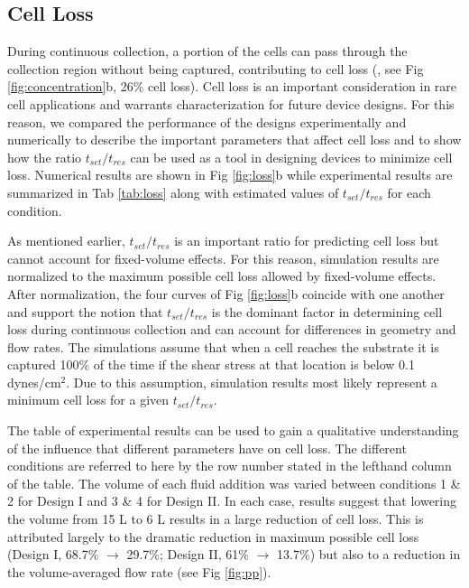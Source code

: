 \subsection{Cell Loss}

During continuous collection, a portion of the cells can pass through the collection region without being captured, contributing to cell loss (\eg , see Fig \ref{fig:concentration}b, 26\% cell loss). Cell loss is an important consideration in rare cell applications and warrants characterization for future device designs. For this reason, we compared the performance of the designs experimentally and numerically to describe the important parameters that affect cell loss and to show how the ratio $t_{set}/t_{res}$ can be used as a tool in designing devices to minimize cell loss. Numerical results are shown in Fig \ref{fig:loss}b while experimental results are summarized in Tab \ref{tab:loss} along with estimated values of $t_{set}/t_{res}$ for each condition.

As mentioned earlier, $t_{set}/t_{res}$ is an important ratio for predicting cell loss but cannot account for fixed-volume effects. For this reason, simulation results are normalized to the maximum possible cell loss allowed by fixed-volume effects. After normalization, the four curves of Fig \ref{fig:loss}b coincide with one another and support the notion that $t_{set}/t_{res}$ is the dominant factor in determining cell loss during continuous collection and can account for differences in geometry and flow rates. The simulations assume that when a cell reaches the substrate it is captured 100\% of the time if the shear stress at that location is below 0.1 dynes/cm$^{2}$. Due to this assumption, simulation results most likely represent a minimum cell loss for a given $t_{set}/t_{res}$.

The table of experimental results can be used to gain a qualitative understanding of the influence that different parameters have on cell loss. The different conditions are referred to here by the row number stated in the lefthand column of the table. The volume of each fluid addition was varied between conditions 1 \& 2 for Design I and 3 \& 4 for Design II. In each case, results suggest that lowering the volume from 15 \textmu L to 6 \textmu L results in a large reduction of cell loss. This is attributed largely to the dramatic reduction in maximum possible cell loss (Design I, 68.7\% $\rightarrow$ 29.7\%; Design II, 61\% $\rightarrow$ 13.7\%) but also to a reduction in the volume-averaged flow rate (see Fig \ref{fig:pp}).


